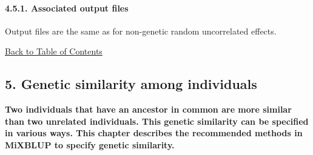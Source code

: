 \paragraph{4.5.1. Associated output files}\label{Obse32}

Output files are the same as for non-genetic random uncorrelated
effects.

\hyperref[Tabl01]{Back to Table of Contents}

\newpage

\subsection{5. Genetic similarity among individuals}\label{Gene01}

\textbf{Two individuals that have an ancestor in common are more similar
than two unrelated individuals. This genetic similarity can be specified
in various ways. This chapter describes the recommended methods in
MiXBLUP to specify genetic similarity.}

